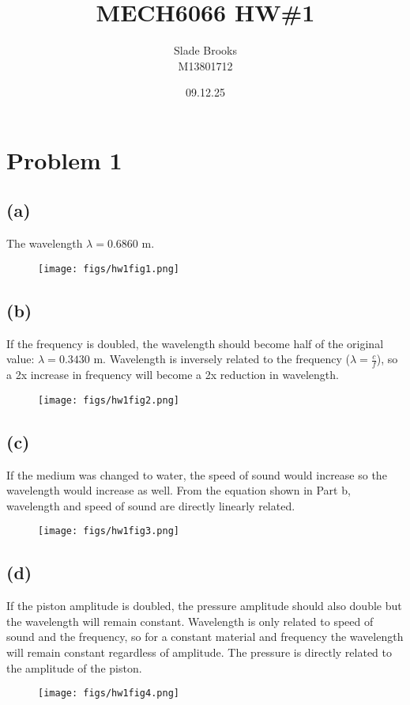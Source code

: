\documentclass[12 pt]{article}
\title{MECH6066 HW\#1}
\date{09.12.25}
\author{Slade Brooks \\ M13801712}
\begin{document}
\maketitle

\section*{Problem 1}

\subsection*{(a)}
The wavelength $\lambda=0.6860$ m.
\begin{figure}[H]
    \centering
    \texttt{[image: figs/hw1fig1.png]}
\end{figure} \par

\pagebreak
\subsection*{(b)}
If the frequency is doubled, the wavelength should become half of the original value: $\lambda=0.3430$ m. Wavelength is
inversely related to the frequency ($\lambda=\frac{c}{f}$), so a 2x increase in frequency will become a 2x reduction in
wavelength.
\begin{figure}[H]
    \centering
    \texttt{[image: figs/hw1fig2.png]}
\end{figure} \par

\pagebreak
\subsection*{(c)}
If the medium was changed to water, the speed of sound would increase so the wavelength would increase as well. From the
equation shown in Part b, wavelength and speed of sound are directly linearly related.
\begin{figure}[H]
    \centering
    \texttt{[image: figs/hw1fig3.png]}
\end{figure} \par

\pagebreak
\subsection*{(d)}
If the piston amplitude is doubled, the pressure amplitude should also double but the wavelength will remain constant.
Wavelength is only related to speed of sound and the frequency, so for a constant material and frequency the wavelength
will remain constant regardless of amplitude. The pressure is directly related to the amplitude of the piston.
\begin{figure}[H]
    \centering
    \texttt{[image: figs/hw1fig4.png]}
\end{figure} \par
\end{document}
